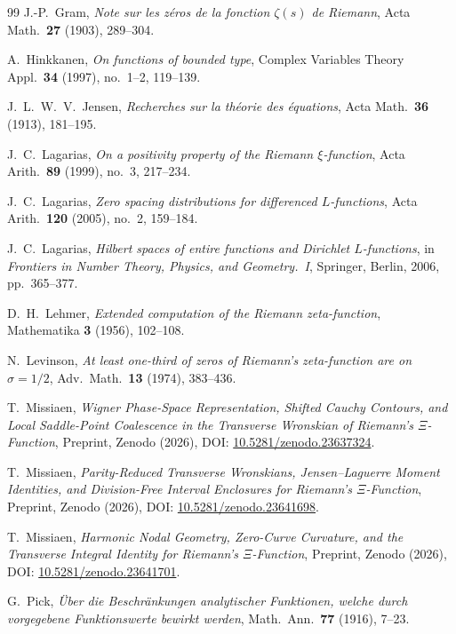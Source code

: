 \documentclass[11pt,reqno]{amsart}
\theoremstyle{definition}
\theoremstyle{remark}
\numberwithin{equation}{section}
\begin{document}
\begin{thebibliography}{99}
J.-P.~Gram,
\emph{Note sur les z\'eros de la fonction $\zeta(s)$ de Riemann},
Acta Math.\ \textbf{27} (1903), 289--304.

A.~Hinkkanen,
\emph{On functions of bounded type},
Complex Variables Theory Appl.\ \textbf{34} (1997), no.~1--2, 119--139.

J.~L.~W.~V.~Jensen,
\emph{Recherches sur la th\'eorie des \'equations},
Acta Math.\ \textbf{36} (1913), 181--195.

J.~C.~Lagarias,
\emph{On a positivity property of the Riemann $\xi$-function},
Acta Arith.\ \textbf{89} (1999), no.~3, 217--234.

J.~C.~Lagarias,
\emph{Zero spacing distributions for differenced $L$-functions},
Acta Arith.\ \textbf{120} (2005), no.~2, 159--184.

J.~C.~Lagarias,
\emph{Hilbert spaces of entire functions and Dirichlet $L$-functions},
in \emph{Frontiers in Number Theory, Physics, and Geometry.~I},
Springer, Berlin, 2006, pp.~365--377.

D.~H.~Lehmer,
\emph{Extended computation of the Riemann zeta-function},
Mathematika \textbf{3} (1956), 102--108.

N.~Levinson,
\emph{At least one-third of zeros of Riemann's zeta-function are on $\sigma = 1/2$},
Adv.\ Math.\ \textbf{13} (1974), 383--436.

T.~Missiaen,
\emph{Wigner Phase-Space Representation, Shifted Cauchy Contours, and Local Saddle-Point Coalescence in the Transverse Wronskian of Riemann's $\Xi$-Function},
Preprint, Zenodo (2026), DOI: \href{https://doi.org/10.5281/zenodo.23637324}{10.5281/zenodo.23637324}.

T.~Missiaen,
\emph{Parity-Reduced Transverse Wronskians, Jensen--Laguerre Moment Identities, and Division-Free Interval Enclosures for Riemann's $\Xi$-Function},
Preprint, Zenodo (2026), DOI: \href{https://doi.org/10.5281/zenodo.23641698}{10.5281/zenodo.23641698}.

T.~Missiaen,
\emph{Harmonic Nodal Geometry, Zero-Curve Curvature, and the Transverse Integral Identity for Riemann's $\Xi$-Function},
Preprint, Zenodo (2026), DOI: \href{https://doi.org/10.5281/zenodo.23641701}{10.5281/zenodo.23641701}.

G.~Pick,
\emph{\"Uber die Beschr\"ankungen analytischer Funktionen, welche durch vorgegebene Funktionswerte bewirkt werden},
Math.\ Ann.\ \textbf{77} (1916), 7--23.


\end{thebibliography}
\end{document}
